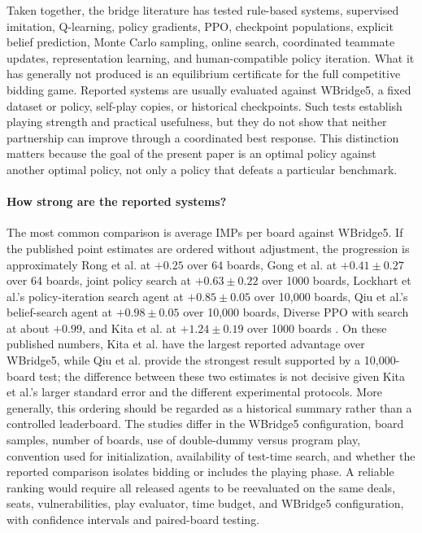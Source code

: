 \documentclass[11pt]{article}
\begin{document}
Taken together, the bridge literature has tested rule-based systems, supervised imitation, Q-learning, policy gradients, PPO, checkpoint populations, explicit belief prediction, Monte Carlo sampling, online search, coordinated teammate updates, representation learning, and human-compatible policy iteration. What it has generally not produced is an equilibrium certificate for the full competitive bidding game. Reported systems are usually evaluated against WBridge5, a fixed dataset or policy, self-play copies, or historical checkpoints. Such tests establish playing strength and practical usefulness, but they do not show that neither partnership can improve through a coordinated best response. This distinction matters because the goal of the present paper is an optimal policy against another optimal policy, not only a policy that defeats a particular benchmark.

\paragraph{How strong are the reported systems?}
The most common comparison is average IMPs per board against WBridge5. If the published point estimates are ordered without adjustment, the progression is approximately Rong et al. at $+0.25$ over 64 boards, Gong et al. at $+0.41\pm0.27$ over 64 boards, joint policy search at $+0.63\pm0.22$ over 1000 boards, Lockhart et al.'s policy-iteration search agent at $+0.85\pm0.05$ over 10,000 boards, Qiu et al.'s belief-search agent at $+0.98\pm0.05$ over 10,000 boards, Diverse PPO with search at about $+0.99$, and Kita et al. at $+1.24\pm0.19$ over 1000 boards \cite{rong2019competitive,gong2019simple,tian2020joint,lockhart2020human,qiu2024bridge,zhang2025diverse,kita2024simple}. On these published numbers, Kita et al. have the largest reported advantage over WBridge5, while Qiu et al. provide the strongest result supported by a 10,000-board test; the difference between these two estimates is not decisive given Kita et al.'s larger standard error and the different experimental protocols. More generally, this ordering should be regarded as a historical summary rather than a controlled leaderboard. The studies differ in the WBridge5 configuration, board samples, number of boards, use of double-dummy versus program play, convention used for initialization, availability of test-time search, and whether the reported comparison isolates bidding or includes the playing phase. A reliable ranking would require all released agents to be reevaluated on the same deals, seats, vulnerabilities, play evaluator, time budget, and WBridge5 configuration, with confidence intervals and paired-board testing.
\end{document}
